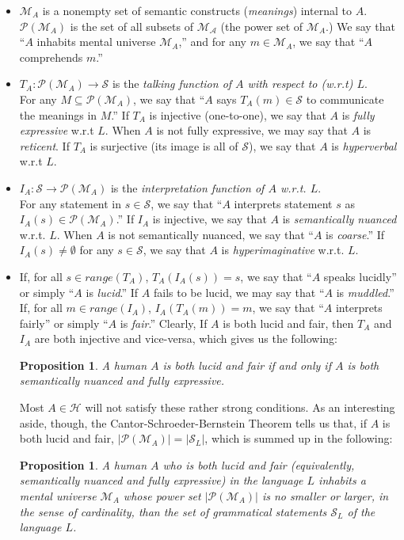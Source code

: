 \documentclass[12pt]{article}
\newtheorem{prop}[thm]{Proposition}
\begin{document}
\begin{itemize}
\item $\mathcal{M}_A$ is a nonempty set of semantic constructs (\textit{meanings}) internal to $A$.  $\mathcal{P}(\mathcal{M}_A)$ is the set of all subsets of $\mathcal{M_A}$ (the power set of $\mathcal{M}_A$.)  We say that ``$A$ inhabits mental universe $\mathcal{M}_A$,'' and for any $m\in\mathcal{M}_A$, we say that ``$A$ comprehends $m$.''

\item $T_A:\mathcal{P}(\mathcal{M}_A)\rightarrow\mathcal{S}$ is the \textit{talking function of $A$ with respect to (w.r.t) $L$}.\\
  For any $M\subseteq \mathcal{P}(\mathcal{M}_A)$, we say that ``$A$ says $T_A(m)\in\mathcal{S}$ to communicate the meanings in $M$.''  If $T_A$ is injective (one-to-one), we say that $A$ is \textit{fully expressive} w.r.t $L$.  When $A$ is not fully expressive, we may say that $A$ is \textit{reticent}.  If $T_A$ is surjective (its image is all of $\mathcal{S}$), we say that $A$ is \textit{hyperverbal} w.r.t $L$.

\item $I_A:\mathcal{S}\rightarrow \mathcal{P}(\mathcal{M}_A)$ is the \textit{interpretation function of $A$ w.r.t. $L$}.\\
  For any statement in $s\in\mathcal{S}$, we say that ``$A$ interprets statement $s$ as $I_A(s)\in\mathcal{P}(\mathcal{M}_A)$.''  If $I_A$ is injective, we say that $A$ is \textit{semantically nuanced} w.r.t. $L$.  When $A$ is not semantically nuanced, we say that ``$A$ is \textit{coarse}.''  If $I_A(s)\neq\emptyset$ for any $s\in\mathcal{S}$, we say that $A$ is \textit{hyperimaginative} w.r.t. $L$.

\item If, for all $s\in range(T_A)$, $T_A(I_A(s))=s$, we say that ``$A$ speaks lucidly'' or simply ``$A$ is \textit{lucid}.''  If $A$ fails to be lucid, we may say that ``$A$ is \textit{muddled}.''
If, for all $m\in range(I_A)$, $I_A(T_A(m))=m$, we say that ``$A$ interprets fairly'' or simply ``$A$ is \textit{fair}.''  Clearly, If $A$ is both lucid and fair, then $T_A$ and $I_A$ are both injective and vice-versa, which gives us the following:
\begin{prop} 
A human $A$ is both lucid and fair if and only if $A$ is both semantically nuanced and fully expressive.
\end{prop}
Most $A\in\mathcal{H}$ will not satisfy these rather strong conditions.  As an interesting aside, though, the Cantor-Schroeder-Bernstein Theorem tells us that, if $A$ is both lucid and fair, $|\mathcal{P}(\mathcal{M}_A)|=|\mathcal{S}_L|$, which is summed up in the following:
\begin{prop}
A human $A$ who is both lucid and fair (equivalently, semantically nuanced and fully expressive) in the language $L$ inhabits a mental universe $\mathcal{M}_A$ whose power set $|\mathcal{P}(\mathcal{M}_A)|$ is no smaller or larger, in the sense of cardinality, than the set of grammatical statements $\mathcal{S}_L$ of the language $L$.
\end{prop}


\end{itemize}
\end{document}
